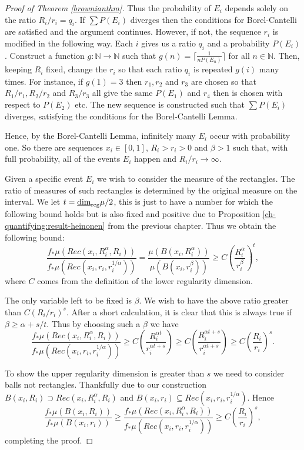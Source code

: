 \begin{proof}[Proof of Theorem \ref{brownianthm}]
Thus the probability of $E_i$ depends solely on the ratio $R_i/r_i = q_i$. If $\sum P(E_i)$ diverges then the conditions for Borel-Cantelli are satisfied and the argument continues. However, if not, the sequence $r_i$ is modified in the following way. Each $i$ gives us a ratio $q_i$ and a probability $P(E_i)$. Construct a function $g \colon \mathbb{N} \rightarrow \mathbb{N}$ such that $g(n) = \lceil \frac{1}{nP(E_n)}\rceil$ for all $n\in \mathbb{N}$. Then, keeping $R_i$ fixed, change the $r_i$ so that each ratio $q_i$ is repeated $g(i)$ many times. For instance, if $g(1) = 3$ then $r_1,r_2$ and $r_3$ are chosen so that $R_1/r_1, R_2/r_2$ and $R_3/r_3$ all give the same $P(E_1)$ and $r_4$ then is chosen with respect to $P(E_2)$ etc. The new sequence is constructed such that $\sum P(E_i)$ diverges, satisfying the conditions for the Borel-Cantelli Lemma.

Hence, by the Borel-Cantelli Lemma, infinitely many $E_i$ occur with probability one. So there are sequences $x_i \in [0,1]$, $R_i > r_i > 0$ and $\beta > 1$ such that, with full probability, all of the events $E_i$ happen and $R_i/r_i \rightarrow \infty$. 

Given a specific event $E_i$ we wish to consider the measure of the rectangles. The ratio of measures of such rectangles is determined by the original measure on the interval. We let $t = \underline{\dim}_{\textup{reg}} \mu / 2$, this is just to have a number for which the following bound holds but is also fixed and positive due to Proposition \ref{ch-quantifying:result-heinonen} from the previous chapter. Thus we obtain the following bound:
\[
\frac{f_*\mu(Rec(x_i,R_i^{\alpha},R_i))}{f_*\mu(Rec(x_i,r_i,r_i^{1/\alpha}))} = \frac{\mu(B(x_i, R_i^{\alpha}))}{\mu(B(x_i, r_i^{\beta}))} \ge C\left(\frac{R_i^{\alpha}}{r_i^{\beta}}\right)^t, 
\]
where $C$ comes from the definition of the lower regularity dimension.

The only variable left to be fixed is $\beta$. We wish to have the above ratio greater than $C(R_i/r_i)^s$. After a short calculation, it is clear that this is always true if $\beta \ge \alpha + s/t$. Thus by choosing such a $\beta$ we have
\[
\frac{f_*\mu(Rec(x_i,R_i^{\alpha},R_i))}{f_*\mu(Rec(x_i,r_i,r_i^{1/\alpha}))} \ge C\left(\frac{R_i^{\alpha t}}{r_i^{\alpha t + s} }\right) \ge C\left(\frac{R_i^{\alpha t + s}}{r_i^{\alpha t + s} }\right)  \ge
C\left(\frac{R_i}{r_i}\right)^s. 
\]

To show the upper regularity dimension is greater than $s$ we need to consider balls not rectangles. Thankfully due to our construction $B(x_i,R_i) \supset Rec(x_i, R_i^\alpha, R_i)$ and $B(x_i,r_i) \subseteq Rec(x_i, r_i, r_i^{1/\alpha})$. Hence
\[
\frac{f_*\mu(B(x_i,R_i))}{f_*\mu(B(x_i,r_i))} \ge \frac{f_*\mu(Rec(x_i,R_i^{\alpha},R_i))}{f_*\mu(Rec(x_i,r_i,r_i^{1/\alpha}))} \ge C\left(\frac{R_i}{r_i}\right)^s ,
\]
completing the proof.


\end{proof}
